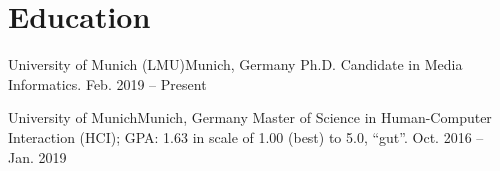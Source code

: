 \section{\textbf{Education}}
  \resumeSubHeadingListStartNoLabel

  \resumeSubheading
    {University of Munich (LMU)}{Munich, Germany}
    {Ph.D. Candidate in Media Informatics.
    }{Feb. 2019 -- Present}
    \resumeItemListStart
    \resumeItemListEnd


  \resumeSubheading
    {University of Munich}{Munich, Germany}
    {Master of Science in Human-Computer Interaction (HCI); GPA: 1.63  in scale of 1.00 (best) to 5.0, ``gut''.
  }{Oct. 2016 -- Jan. 2019}
  \resumeItemListStart
  \resumeItemListEnd

